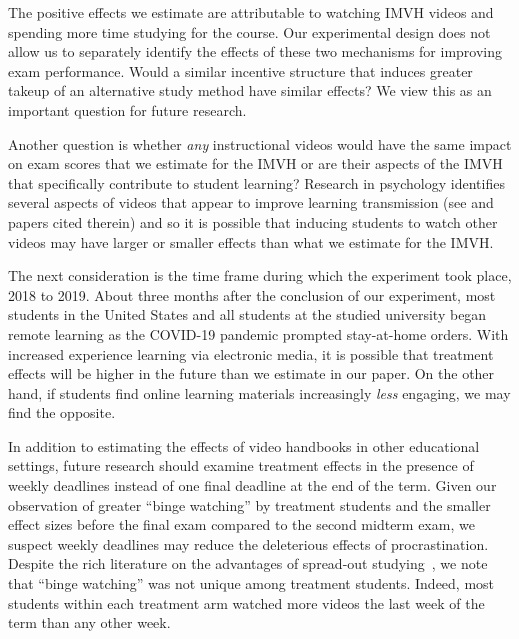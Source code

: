\documentclass[12pt]{article}
\begin{document}
The positive effects we estimate are attributable to watching IMVH videos and spending more time studying for the course.
Our experimental design does not allow us to separately identify the effects of these two mechanisms for improving exam performance.
Would a similar incentive structure that induces greater takeup of an alternative study method have similar effects?
We view this as an important question for future research.

Another question is whether \textit{any} instructional videos would have the same impact on exam scores that we estimate for the IMVH or are their aspects of the IMVH that specifically contribute to student learning?
 Research in psychology identifies several aspects of videos that appear to improve learning transmission (see \textcite{mayer2021} and papers cited therein) and so it is possible that inducing students to watch other videos may have larger or smaller effects than what we estimate for the IMVH.

The next consideration is the time frame during which the experiment took place, 2018 to 2019.
About three months after the conclusion of our experiment, most students in the United States and all students at the studied university began remote learning as the COVID-19 pandemic prompted stay-at-home orders.
With increased experience learning via electronic media, it is possible that treatment effects will be higher in the future than we estimate in our paper.
On the other hand, if students find online learning materials increasingly \textit{less} engaging, we may find the opposite.

In addition to estimating the effects of video handbooks in other educational settings, future research should examine treatment effects in the presence of weekly deadlines instead of one final deadline at the end of the term.
Given our observation of greater ``binge watching'' by treatment students and the smaller effect sizes before the final exam compared to the second midterm exam, we suspect weekly deadlines may reduce the deleterious effects of procrastination.
Despite the rich literature on the advantages of spread-out studying~\parencite{kornell2009, cpvw2006}, we note that ``binge watching'' was not unique among treatment students.
Indeed, most students within each treatment arm watched more videos the last week of the term than any other week.


\end{document}

